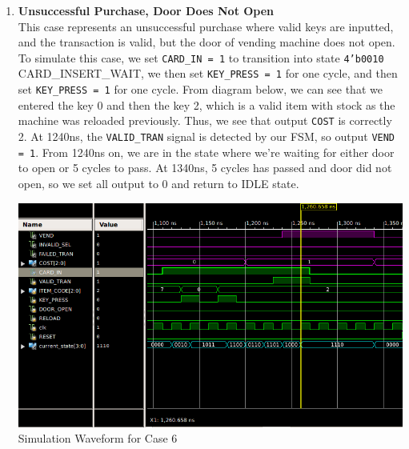 \documentclass{article}
\begin{document}
\begin{enumerate}
    \item \textbf{Unsuccessful Purchase, Door Does Not Open}   \\
    This case represents an unsuccessful purchase where valid keys are inputted, and the transaction is valid, but the door of vending machine does not open. To simulate this case, we set \texttt{CARD\_IN = 1} to transition into state \texttt{4'b0010} CARD\_INSERT\_WAIT, we then set \texttt{KEY\_PRESS = 1} for one cycle, and then set \texttt{KEY\_PRESS = 1} for one cycle. From diagram below, we can see that we entered the key 0 and then the key 2, which is a valid item with stock as the machine was reloaded previously. Thus, we see that output \texttt{COST} is correctly 2. At 1240ns, the \texttt{VALID\_TRAN} signal is detected by our FSM, so output \texttt{VEND = 1}. From 1240ns on, we are in the state where we're waiting for either door to open or 5 cycles to pass. At 1340ns, 5 cycles has passed and door did not open, so we set all output to 0 and return to IDLE state. 
    \begin{center}
        \includegraphics[scale=0.5]{waveform-6.png} \\
        \caption{Simulation Waveform for Case 6}
    \end{center}
    

\end{enumerate}
\end{document}
